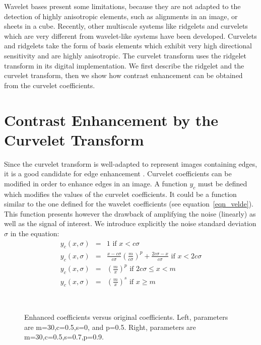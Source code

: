 Wavelet bases present some limitations,
because they are not adapted to the detection of highly anisotropic elements,
such as alignments in an image, or sheets in a cube. 
Recently, other multiscale
systems like ridgelets \cite{Harmnet} and 
curvelets \cite{Curvelets-StMalo,starck:sta01_3}    
which are very different from wavelet-like systems have been developed. 
Curvelets and ridgelets take  the form of basis elements which 
exhibit very high directional sensitivity and are highly anisotropic. 
The curvelet transform uses the ridgelet transform in its digital 
implementation. We first describe the ridgelet and the curvelet 
transform, then we show how contrast enhancement can be obtained 
from the curvelet coefficients.

\section{Contrast Enhancement by the Cur\-ve\-let Trans\-form}

Since the curvelet transform is well-adapted to represent images containing edges,
it is a good candidate for edge enhancement \cite{starck:capri02,starck:sta02_4}. 
Curvelet coefficients
can be modified in order to enhance edges in an image. A function $y_c$
must be defined which modifies the values of the curvelet 
coefficients. It could be a function similar to the one defined for the 
wavelet coefficients \cite{col:velde99} (see equation~\ref{eqn_velde}).
This function presents however the drawback of amplifying the noise (linearly)
as well as the signal of interest. We introduce explicitly the noise standard 
deviation $\sigma$ in the equation:
\begin{eqnarray}
  y_c(x, \sigma) & = & 1 \mbox{ if }   x < c \sigma \nonumber \\
  y_c(x, \sigma) & = & \frac{x-c\sigma}{c \sigma}(\frac{m}{c \sigma})^p + \frac{2c\sigma-x}{c \sigma}  \mbox{ if } x < 2c \sigma \nonumber \\
  y_c(x, \sigma) & = & (\frac{m}{x})^p  \mbox{ if } 2c\sigma \le x < m \nonumber \\
  y_c(x, \sigma) & = & (\frac{m}{x})^s \mbox{ if }x \ge m
\label{eqn_velde_curve}
\end{eqnarray}

\begin{figure}[htb]
\centerline{  
\hbox{
}}
\caption{Enhanced coefficients versus  original coefficients. Left, 
parameters are m=30,c=0.5,s=0, and p=0.5. Right, 
parameters are m=30,c=0.5,s=0.7,p=0.9.
}
\label{fig_velde_cur_enhance}
\end{figure}

